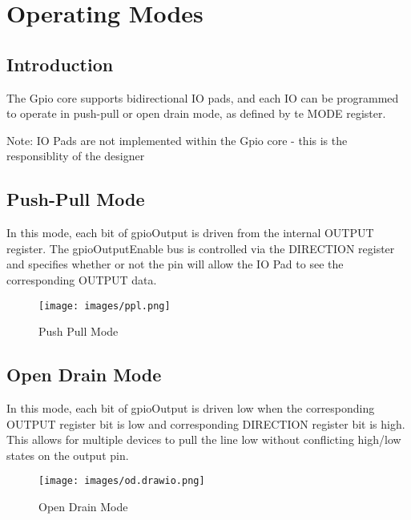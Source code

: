 \section{Operating Modes}

\subsection{Introduction}
The Gpio core supports bidirectional IO pads, and each IO can be programmed to operate in 
push-pull or open drain mode, as defined by te MODE register.

Note: IO Pads are not implemented within the Gpio core - this is the responsiblity of the designer

\subsection{Push-Pull Mode}
In this mode, each bit of gpioOutput is driven from the internal OUTPUT register. The gpioOutputEnable bus is controlled via the DIRECTION register and 
specifies whether or not the pin will allow the IO Pad to see the corresponding OUTPUT data.

\begin{figure}[h]
    \centering
    \texttt{[image: images/ppl.png]}
    \caption{Push Pull Mode}
  \end{figure}

\subsection{Open Drain Mode}
In this mode, each bit of gpioOutput is driven low when the corresponding OUTPUT register bit is low and corresponding DIRECTION register bit is high. 
This allows for multiple devices to pull the line low without conflicting high/low states on the output pin.

\begin{figure}[h]
    \centering
    \texttt{[image: images/od.drawio.png]}
    \caption{Open Drain Mode}
  \end{figure}